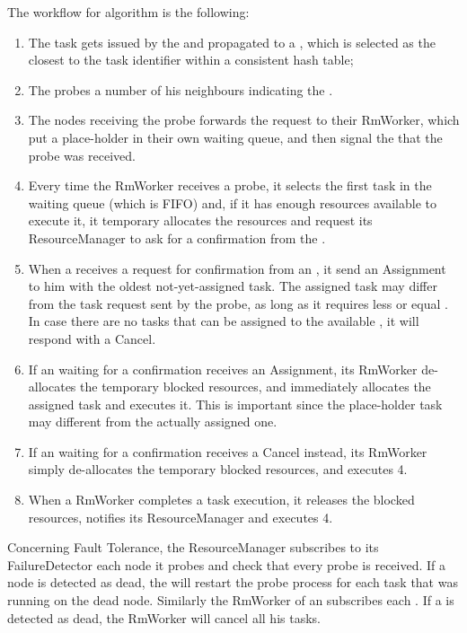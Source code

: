 \documentclass[conference]{IEEEtran}
\begin{document}
  The workflow for \us algorithm is the following:
  \begin{enumerate}
  
  \item The task gets issued by the \dc and propagated
        to a \tmast, which is selected as the closest to the task
        identifier within a consistent hash table;

 \item The \tmast probes a number of his neighbours indicating the \treq.
 
 \item The nodes receiving the probe forwards the request to their RmWorker, which put a place-holder in their own waiting queue, and then signal the \tmast that the probe was received.
 
 \item Every time the RmWorker receives a probe, it selects the first task in the waiting queue (which is FIFO) and, if it has enough resources available to execute it, it temporary allocates the \treq resources and request its ResourceManager to ask for a confirmation from the \tmast.
 
 \item When a \tmast receives a request for confirmation from an \exc, it send an Assignment to him with the oldest not-yet-assigned task. The assigned task may differ from the task request sent by the probe, as long as it requires less or equal \treq. In case there are no tasks that can be assigned to the available \exc, it will respond with a Cancel.
 
 \item If an \exc waiting for a confirmation receives an Assignment, its RmWorker de-allocates the temporary blocked resources, and immediately allocates the assigned task and executes it. This is important since the place-holder task may different from the actually assigned one.

 \item If an \exc waiting for a confirmation receives a Cancel instead, its RmWorker simply de-allocates the temporary blocked resources, and executes 4.
 
 \item When a \exc RmWorker completes a task execution, it releases the blocked resources, notifies its ResourceManager and executes 4.
 
  \end{enumerate}
 
 Concerning Fault Tolerance, the ResourceManager subscribes to its FailureDetector each node it probes and check that every probe is received. If a node is detected as dead, the \tmast will restart the probe process for each task that was running on the dead node. Similarly the RmWorker of an \exc subscribes each \tmast. If a \tmast is detected as dead, the RmWorker will cancel all his tasks.
  
\end{document}
